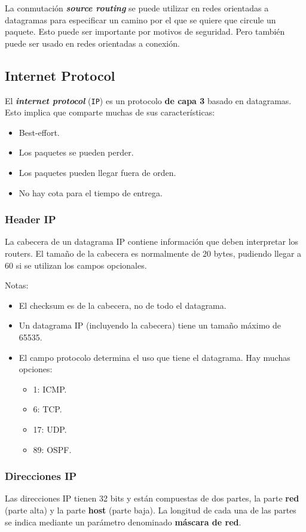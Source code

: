 \documentclass[]{article}
\begin{document}
La conmutación \textbf{\emph{source routing}} se puede utilizar en redes orientadas a datagramas para especificar un camino por el que se quiere que circule un paquete. Esto puede ser importante por motivos de seguridad. Pero también puede ser usado en redes orientadas a conexión.

\subsection{Internet Protocol}
El \textbf{\emph{internet protocol}} (\texttt{IP}) es un protocolo \textbf{de capa 3} basado en datagramas. Esto implica que comparte muchas de sus características:
\begin{itemize}
    \item Best-effort.
    \item Los paquetes se pueden perder.
    \item Los paquetes pueden llegar fuera de orden.
    \item No hay cota para el tiempo de entrega.
\end{itemize}

\subsubsection{Header IP}

La cabecera de un datagrama IP contiene información que deben interpretar los routers. El tamaño de la cabecera es normalmente de 20 bytes, pudiendo llegar a 60 si se utilizan los campos opcionales.


Notas:
\begin{itemize}
    \item El checksum es de la cabecera, no de todo el datagrama.
    \item Un datagrama IP (incluyendo la cabecera) tiene un tamaño máximo de 65535.
    \item El campo protocolo determina el uso que tiene el datagrama. Hay muchas opciones:
    \begin{itemize}
        \item 1: ICMP.
        \item 6: TCP.
        \item 17: UDP.
        \item 89: OSPF.
    \end{itemize}
\end{itemize}

\subsubsection{Direcciones IP}
Las direcciones IP tienen 32 bits y están compuestas de dos partes, la parte \textbf{red} (parte alta) y la parte \textbf{host} (parte baja). La longitud de cada una de las partes se indica mediante un parámetro denominado \textbf{máscara de red}.
\end{document}
